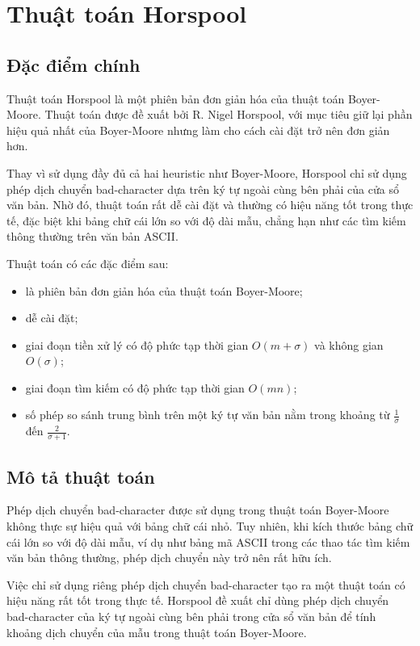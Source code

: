 \section{Thuật toán Horspool}

\subsection{Đặc điểm chính}

Thuật toán Horspool là một phiên bản đơn giản hóa của thuật toán Boyer-Moore. Thuật toán được đề xuất bởi R. Nigel Horspool, với mục tiêu giữ lại phần hiệu quả nhất của Boyer-Moore nhưng làm cho cách cài đặt trở nên đơn giản hơn.

Thay vì sử dụng đầy đủ cả hai heuristic như Boyer-Moore, Horspool chỉ sử dụng phép dịch chuyển bad-character dựa trên ký tự ngoài cùng bên phải của cửa sổ văn bản. Nhờ đó, thuật toán rất dễ cài đặt và thường có hiệu năng tốt trong thực tế, đặc biệt khi bảng chữ cái lớn so với độ dài mẫu, chẳng hạn như các tìm kiếm thông thường trên văn bản ASCII.

Thuật toán có các đặc điểm sau:

\begin{itemize}
    \item là phiên bản đơn giản hóa của thuật toán Boyer-Moore;
    \item dễ cài đặt;
    \item giai đoạn tiền xử lý có độ phức tạp thời gian \(O(m+\sigma)\) và không gian \(O(\sigma)\);
    \item giai đoạn tìm kiếm có độ phức tạp thời gian \(O(mn)\);
    \item số phép so sánh trung bình trên một ký tự văn bản nằm trong khoảng từ \(\frac{1}{\sigma}\) đến \(\frac{2}{\sigma+1}\).
\end{itemize}

\subsection{Mô tả thuật toán}

Phép dịch chuyển bad-character được sử dụng trong thuật toán Boyer-Moore không thực sự hiệu quả với bảng chữ cái nhỏ. Tuy nhiên, khi kích thước bảng chữ cái lớn so với độ dài mẫu, ví dụ như bảng mã ASCII trong các thao tác tìm kiếm văn bản thông thường, phép dịch chuyển này trở nên rất hữu ích.

Việc chỉ sử dụng riêng phép dịch chuyển bad-character tạo ra một thuật toán có hiệu năng rất tốt trong thực tế. Horspool đề xuất chỉ dùng phép dịch chuyển bad-character của ký tự ngoài cùng bên phải trong cửa sổ văn bản để tính khoảng dịch chuyển của mẫu trong thuật toán Boyer-Moore.

